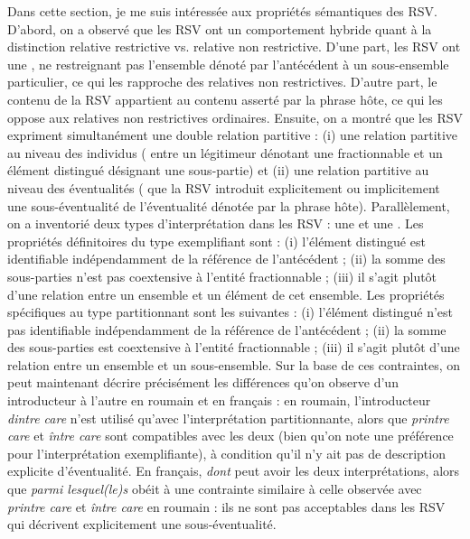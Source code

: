 Dans cette section, je me suis intéressée aux propriétés sémantiques des RSV. D’abord, on a observé que les RSV ont un comportement hybride quant à la distinction relative restrictive vs. relative non restrictive. D’une part, les RSV ont une , ne restreignant pas l’ensemble dénoté par l’antécédent à un sous-ensemble particulier, ce qui les rapproche des relatives non restrictives. D’autre part, le contenu de la RSV appartient au contenu asserté par la phrase hôte, ce qui les oppose aux relatives non restrictives ordinaires. Ensuite, on a montré que les RSV expriment simultanément une double relation partitive : (i) une relation partitive au niveau des individus ({\cad} entre un légitimeur dénotant une  fractionnable et un élément distingué désignant une sous-partie) et (ii) une relation partitive au niveau des éventualités ({\cad} que la RSV introduit explicitement ou implicitement une sous-éventualité de l’éventualité dénotée par la phrase hôte). Parallèlement, on a inventorié deux types d’interprétation dans les RSV : une  et une . Les propriétés définitoires du type exemplifiant sont : (i) l’élément distingué est identifiable indépendamment de la référence de l’antécédent ; (ii) la somme des sous-parties n’est pas coextensive à l’entité fractionnable ; (iii) il s’agit plutôt d’une relation entre un ensemble et un élément de cet ensemble. Les propriétés spécifiques au type partitionnant sont les suivantes : (i) l’élément distingué n’est pas identifiable indépendamment de la référence de l’antécédent ; (ii) la somme des sous-parties est coextensive à l’entité fractionnable ; (iii) il s’agit plutôt d’une relation entre un ensemble et un sous-ensemble. Sur la base de ces contraintes, on peut maintenant décrire précisément les différences qu’on observe d’un introducteur à l’autre en roumain et en français : en roumain, l’introducteur \textit{dintre care} n’est utilisé qu’avec l’interprétation partitionnante, alors que \textit{printre care} et \textit{între care} sont compatibles avec les deux (bien qu’on note une préférence pour l’interprétation exemplifiante), à condition qu’il n’y ait pas de description explicite d’éventualité. En français, \textit{dont} peut avoir les deux interprétations, alors que \textit{parmi lesquel(le)s} obéit à une contrainte similaire à celle observée avec \textit{printre care} et \textit{între care} en roumain : ils ne sont pas acceptables dans les RSV qui décrivent explicitement une sous-éventualité. 


